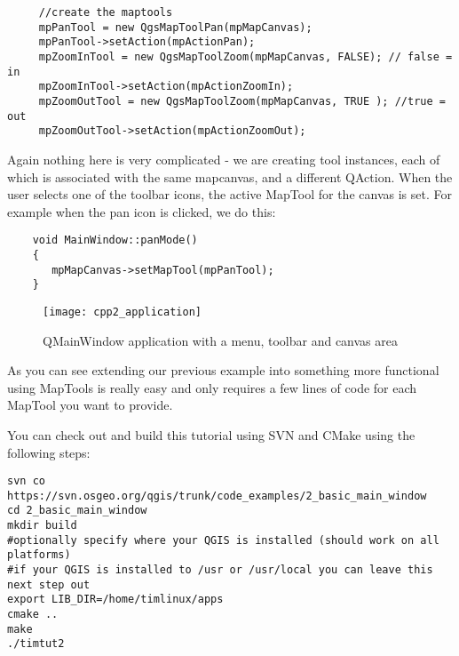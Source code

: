 \begin{verbatim}
     //create the maptools
     mpPanTool = new QgsMapToolPan(mpMapCanvas);
     mpPanTool->setAction(mpActionPan);
     mpZoomInTool = new QgsMapToolZoom(mpMapCanvas, FALSE); // false = in
     mpZoomInTool->setAction(mpActionZoomIn);
     mpZoomOutTool = new QgsMapToolZoom(mpMapCanvas, TRUE ); //true = out
     mpZoomOutTool->setAction(mpActionZoomOut);
\end{verbatim}

Again nothing here is very complicated - we are creating tool instances, each
of which is associated with the same mapcanvas, and a different QAction. When
the user selects one of the toolbar icons, the active MapTool for the canvas is
set. For example when the pan icon is clicked, we do this:

\begin{verbatim}
    void MainWindow::panMode()
    {
       mpMapCanvas->setMapTool(mpPanTool); 
    }
\end{verbatim}

\begin{figure}[ht]
   \begin{center}
   \caption{QMainWindow application with a menu, toolbar and canvas area
\osxcaption}\label{fig:cpp2_application}\smallskip
   \texttt{[image: cpp2\_application]}
\end{center}
\end{figure}


As you can see extending our previous example into something more functional
using MapTools is really easy and only requires a few lines of code for each
MapTool you want to provide.

You can check out and build this tutorial using SVN and CMake using the following steps:

\begin{verbatim}
svn co https://svn.osgeo.org/qgis/trunk/code_examples/2_basic_main_window
cd 2_basic_main_window
mkdir build
#optionally specify where your QGIS is installed (should work on all platforms)
#if your QGIS is installed to /usr or /usr/local you can leave this next step out
export LIB_DIR=/home/timlinux/apps
cmake ..
make
./timtut2
\end{verbatim}


